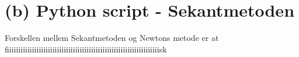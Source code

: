 \section*{(b) Python script - Sekantmetoden}

Forskellen mellem Sekantmetoden og Newtons metode er at fiiiiiiiiiiiiiiiiiiiiiiiiiiiiiiiiiiiiiiiiiiiiiiiiiiiiiiiiiiiiiiiiiiisk 
